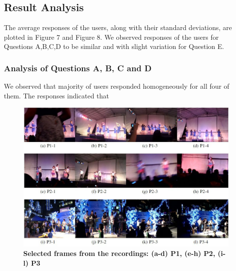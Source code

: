 \documentclass{sig-alternate-05-2015}
\begin{document}
\subsection{Result Analysis}
The average responses of the users, along with their standard
deviations, are plotted in Figure 7 and Figure 8. We observed responses of the users for Questions A,B,C,D to be similar and with
slight variation for Question E.
\subsubsection{Analysis of Questions A, B, C and D}
We observed that majority of users responded homogeneously
for all four of them. The responses indicated that 

\begin{figure}
\centering
\includegraphics[width=5in]{video_4.pdf}
\caption{\textbf{Selected frames from the recordings: (a-d) P1, (e-h) P2, (i-l) P3}}
\end{figure}
\end{document}
